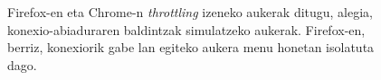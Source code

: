 \begin{figure}[ht]
	\centering
{}
\caption{Firefox-en eta Chrome-n \textit{throttling} izeneko aukerak ditugu, alegia, konexio-abiaduraren baldintzak simulatzeko aukerak. Firefox-en, berriz, konexiorik gabe lan egiteko aukera menu honetan isolatuta dago.}
\label{fig:lineazkanpo}
\end{figure}
